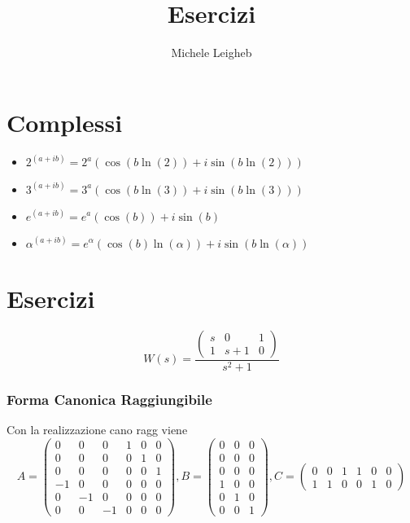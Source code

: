 \documentclass{article}
\title{Esercizi}
\author{Michele Leigheb}
\date{}
\begin{document}
\maketitle
\tableofcontents{}
\section{Complessi}
\begin{itemize}
	\item \(\displaystyle 2^{(a+ib)} = 2^a (\cos(b \ln(2)) + i\sin(b \ln(2))) \)
	\item \(\displaystyle 3^{(a+ib)} = 3^a (\cos(b \ln(3)) + i\sin(b \ln(3))) \)
	\item \(\displaystyle e^{(a+ib)} = e^a (\cos(b)) + i\sin(b) \)
	\item \(\displaystyle \alpha^{(a+ib)} = e^{\alpha} (\cos(b)\ln(\alpha)) + i\sin(b\ln(\alpha)) \)
\end{itemize}



\section{Esercizi}

\[ W(s) = \frac{\left(\begin{matrix}s & 0 & 1\\1 & s + 1 & 0\end{matrix}\right)}{s^{2} + 1} \]
\subsubsection{Forma Canonica Raggiungibile}
Con la realizzazione cano ragg viene \[ A = \left(\begin{matrix}0 & 0 & 0 & 1 & 0 & 0\\0 & 0 & 0 & 0 & 1 & 0\\0 & 0 & 0 & 0 & 0 & 1\\-1 & 0 & 0 & 0 & 0 & 0\\0 & -1 & 0 & 0 & 0 & 0\\0 & 0 & -1 & 0 & 0 & 0\end{matrix}\right), B = \left(\begin{matrix}0 & 0 & 0\\0 & 0 & 0\\0 & 0 & 0\\1 & 0 & 0\\0 & 1 & 0\\0 & 0 & 1\end{matrix}\right), C= \left(\begin{matrix}0 & 0 & 1 & 1 & 0 & 0\\1 & 1 & 0 & 0 & 1 & 0\end{matrix}\right) \]
\end{document}
